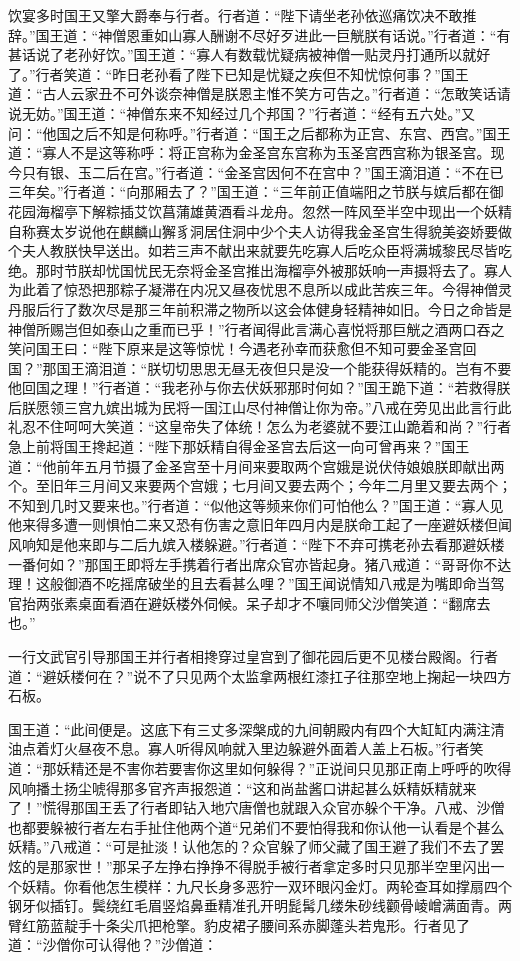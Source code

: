 \documentclass[12pt,UTF8]{ctexbook}
\begin{document}
饮宴多时国王又擎大爵奉与行者。行者道：“陛下请坐老孙依巡痛饮决不敢推辞。”国王道：“神僧恩重如山寡人酬谢不尽好歹进此一巨觥朕有话说。”行者道：“有甚话说了老孙好饮。”国王道：“寡人有数载忧疑病被神僧一贴灵丹打通所以就好了。”行者笑道：“昨日老孙看了陛下已知是忧疑之疾但不知忧惊何事？”国王道：“古人云家丑不可外谈奈神僧是朕恩主惟不笑方可告之。”行者道：“怎敢笑话请说无妨。”国王道：“神僧东来不知经过几个邦国？”行者道：“经有五六处。”又问：“他国之后不知是何称呼。”行者道：“国王之后都称为正宫、东宫、西宫。”国王道：“寡人不是这等称呼：将正宫称为金圣宫东宫称为玉圣宫西宫称为银圣宫。现今只有银、玉二后在宫。”行者道：“金圣宫因何不在宫中？”国王滴泪道：“不在已三年矣。”行者道：“向那厢去了？”国王道：“三年前正值端阳之节朕与嫔后都在御花园海榴亭下解粽插艾饮菖蒲雄黄酒看斗龙舟。忽然一阵风至半空中现出一个妖精自称赛太岁说他在麒麟山獬豸洞居住洞中少个夫人访得我金圣宫生得貌美姿娇要做个夫人教朕快早送出。如若三声不献出来就要先吃寡人后吃众臣将满城黎民尽皆吃绝。那时节朕却忧国忧民无奈将金圣宫推出海榴亭外被那妖响一声摄将去了。寡人为此着了惊恐把那粽子凝滞在内况又昼夜忧思不息所以成此苦疾三年。今得神僧灵丹服后行了数次尽是那三年前积滞之物所以这会体健身轻精神如旧。今日之命皆是神僧所赐岂但如泰山之重而已乎！”行者闻得此言满心喜悦将那巨觥之酒两口吞之笑问国王曰：“陛下原来是这等惊忧！今遇老孙幸而获愈但不知可要金圣宫回国？”那国王滴泪道：“朕切切思思无昼无夜但只是没一个能获得妖精的。岂有不要他回国之理！”行者道：“我老孙与你去伏妖邪那时何如？”国王跪下道：“若救得朕后朕愿领三宫九嫔出城为民将一国江山尽付神僧让你为帝。”八戒在旁见出此言行此礼忍不住呵呵大笑道：“这皇帝失了体统！怎么为老婆就不要江山跪着和尚？”行者急上前将国王搀起道：“陛下那妖精自得金圣宫去后这一向可曾再来？”国王道：“他前年五月节摄了金圣宫至十月间来要取两个宫娥是说伏侍娘娘朕即献出两个。至旧年三月间又来要两个宫娥；七月间又要去两个；今年二月里又要去两个；不知到几时又要来也。”行者道：“似他这等频来你们可怕他么？”国王道：“寡人见他来得多遭一则惧怕二来又恐有伤害之意旧年四月内是朕命工起了一座避妖楼但闻风响知是他来即与二后九嫔入楼躲避。”行者道：“陛下不弃可携老孙去看那避妖楼一番何如？”那国王即将左手携着行者出席众官亦皆起身。猪八戒道：“哥哥你不达理！这般御酒不吃摇席破坐的且去看甚么哩？”国王闻说情知八戒是为嘴即命当驾官抬两张素桌面看酒在避妖楼外伺候。呆子却才不嚷同师父沙僧笑道：“翻席去也。”

一行文武官引导那国王并行者相搀穿过皇宫到了御花园后更不见楼台殿阁。行者道：“避妖楼何在？”说不了只见两个太监拿两根红漆扛子往那空地上掬起一块四方石板。

国王道：“此间便是。这底下有三丈多深槃成的九间朝殿内有四个大缸缸内满注清油点着灯火昼夜不息。寡人听得风响就入里边躲避外面着人盖上石板。”行者笑道：“那妖精还是不害你若要害你这里如何躲得？”正说间只见那正南上呼呼的吹得风响播土扬尘唬得那多官齐声报怨道：“这和尚盐酱口讲起甚么妖精妖精就来了！”慌得那国王丢了行者即钻入地穴唐僧也就跟入众官亦躲个干净。八戒、沙僧也都要躲被行者左右手扯住他两个道“兄弟们不要怕得我和你认他一认看是个甚么妖精。”八戒道：“可是扯淡！认他怎的？众官躲了师父藏了国王避了我们不去了罢炫的是那家世！”那呆子左挣右挣挣不得脱手被行者拿定多时只见那半空里闪出一个妖精。你看他怎生模样：九尺长身多恶狞一双环眼闪金灯。两轮查耳如撑扇四个钢牙似插钉。鬓绕红毛眉竖焰鼻垂精准孔开明髭髯几缕朱砂线颧骨崚嶒满面青。两臂红筋蓝靛手十条尖爪把枪擎。豹皮裙子腰间系赤脚蓬头若鬼形。行者见了道：“沙僧你可认得他？”沙僧道：
\end{document}
